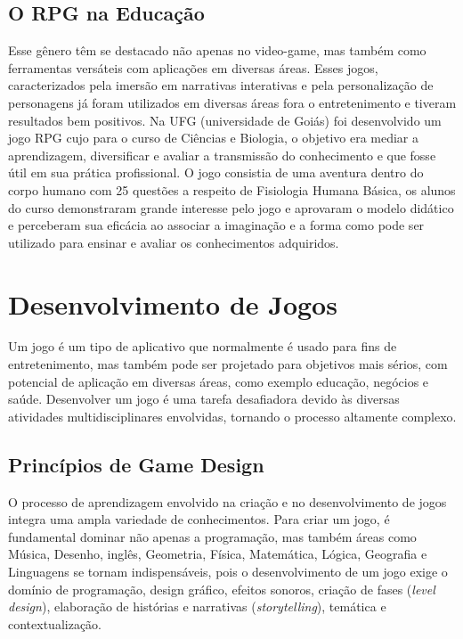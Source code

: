 \subsection{O RPG na Educação}
\label{sec:rpg-na-educacao}
Esse gênero têm se destacado não apenas no video-game, mas também como ferramentas versáteis com aplicações em diversas áreas. Esses jogos, caracterizados pela imersão em narrativas interativas e pela personalização de personagens já foram utilizados em diversas áreas fora o entretenimento e tiveram resultados bem positivos. Na UFG (universidade de Goiás) foi desenvolvido um jogo RPG cujo para o curso de Ciências e Biologia, o 
objetivo era mediar a aprendizagem, diversificar e avaliar a transmissão do conhecimento e que fosse útil em sua prática profissional. O jogo consistia de uma aventura dentro do corpo humano com 25 questões a respeito de Fisiologia Humana Básica, os alunos do curso demonstraram grande interesse pelo jogo e aprovaram o modelo didático e perceberam sua eficácia ao associar a imaginação e a forma como pode ser utilizado para ensinar e avaliar os conhecimentos adquiridos.\cite{soares2016role}


% 

\section{Desenvolvimento de Jogos}
\label{sec-desenvolvimento-de-jogos}
Um jogo é um tipo de aplicativo que normalmente é usado para fins de entretenimento, mas também pode ser projetado para objetivos mais sérios, com potencial de aplicação em diversas áreas, como exemplo educação, negócios e saúde.
Desenvolver um jogo é uma tarefa desafiadora devido às diversas atividades multidisciplinares envolvidas, tornando o processo altamente complexo. 

\subsection{Princípios de Game Design}
\label{sec:principios-de-game-design}
O processo de aprendizagem envolvido na criação e no desenvolvimento de jogos integra uma ampla variedade de conhecimentos. Para criar um jogo, é fundamental dominar não apenas a programação, mas também áreas como Música, Desenho, inglês, Geometria, Física, Matemática, Lógica, Geografia e Linguagens se tornam indispensáveis, pois o desenvolvimento de um jogo exige o domínio de programação, design gráfico, efeitos sonoros, criação de fases (\textit{level design}), elaboração de histórias e narrativas (\textit{storytelling}), temática e contextualização.

